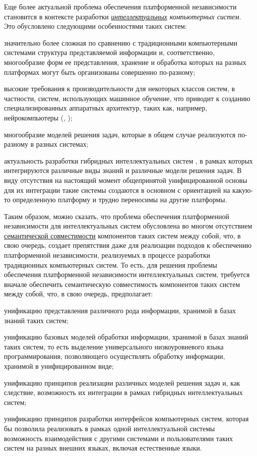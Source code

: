 Еще более актуальной проблема обеспечения платформенной независимости становится в контексте разработки \textit{\uline{интеллектуальных} компьютерных систем}. Это обусловлено следующими особенностями таких систем:
\begin{textitemize}
	\item значительно более сложная по сравнению с традиционными компьютерными системами структура представляемой информации и, соответственно, многообразие форм ее представления, хранение и обработка которых на разных платформах могут быть организованы совершенно по-разному;
	\item высокие требования к производительности для некоторых классов систем, в частности, систем, использующих машинное обучение, что приводит к созданию специализированных аппаратных архитектур, таких как, например, нейрокомпьютеры (, );
	\item многообразие моделей решения задач, которые в общем случае реализуются по-разному в разных системах;
	\item актуальность разработки гибридных интеллектуальных систем , в рамках которых интегрируются различные виды знаний и различные модели решения задач. В виду отсутствия на настоящий момент общепринятой унифицированной основы для их интеграции такие системы создаются в основном с ориентацией на какую-то определенную платформу и трудно переносимы на другие платформы.
\end{textitemize}

Таким образом, можно сказать, что проблема обеспечения платформенной независимости для интеллектуальных систем обусловлена во многом отсутствием \uline{семантической совместимости} компонентов таких систем между собой, что, в свою очередь, создает препятствия даже для реализации подходов к обеспечению платформенной независимости, реализуемых в процессе разработки традиционных компьютерных систем. То есть, для решения проблемы обеспечения платформенной независимости интеллектуальных систем, требуется вначале обеспечить семантическую совместимость компонентов таких систем между собой, что, в свою очередь, предполагает:
\begin{textitemize}
	\item унификацию представления различного рода информации, хранимой в базах знаний таких систем;
	\item унификацию базовых моделей обработки информации, хранимой в базах знаний таких систем, то есть выделение универсального низкоуровневого языка программирования, позволяющего осуществлять обработку информации, хранимой в унифицированном виде;
	\item унификацию принципов реализации различных моделей решения задач и, как следствие, возможность их интеграции в рамках гибридных интеллектуальных систем;
	\item унификацию принципов разработки интерфейсов компьютерных систем, которая бы позволила реализовать в рамках одной интеллектуальной системы возможность взаимодействия с другими системами и пользователями таких систем на разных внешних языках, включая естественные языки.
\end{textitemize}

